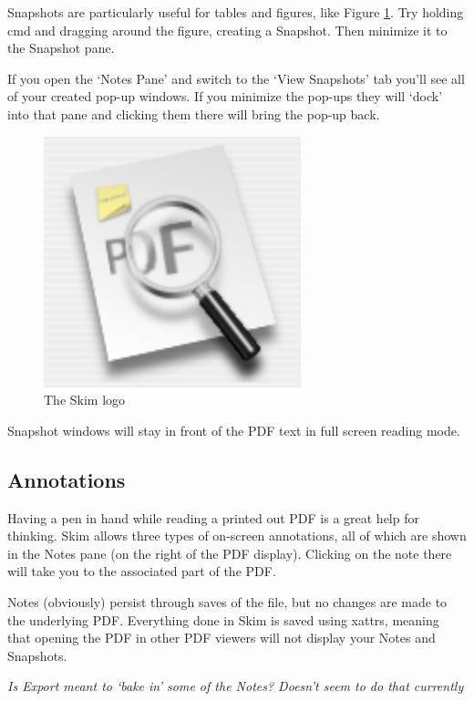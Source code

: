 \documentclass[11pt]{article}
\begin{document}
Snapshots are particularly useful for tables and figures, like Figure \ref{skim-logo}.  Try holding cmd and dragging around the figure, creating a Snapshot.  Then minimize it to the Snapshot pane.

If you open the `Notes Pane' and switch to the `View Snapshots' tab you'll see all of your created pop-up windows.  If you minimize the pop-ups they will `dock' into that pane and clicking them there will bring the pop-up back.

\begin{figure}
\begin{center}
\includegraphics[]{SkimLogo}
\caption{The Skim logo}
\label{skim-logo}
\end{center}
\end{figure}

Snapshot windows will stay in front of the PDF text in full screen reading mode.

\subsection{Annotations}

Having a pen in hand while reading a printed out PDF is a great help for thinking.  Skim allows three types of on-screen annotations, all of which are shown in the Notes pane (on the right of the PDF display).  Clicking on the note there will take you to the associated part of the PDF.

Notes (obviously) persist through saves of the file, but no changes are made to the underlying PDF.  Everything done in Skim is saved using xattrs, meaning that opening the PDF in other PDF viewers will not display your Notes and Snapshots.

\textit{Is Export meant to `bake in' some of the Notes?  Doesn't seem to do that currently}
\end{document}
